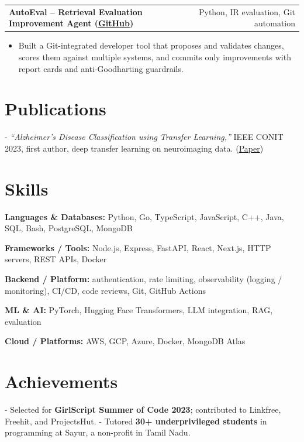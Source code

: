 \documentclass[letterpaper,11pt]{article}
\makeatletter
\newcommand{\projItem}[2]{%
  \vspace{6pt}
  \begin{tabular*}{\textwidth}{@{}l@{\extracolsep{\fill}}r@{}}
    \textbf{#1} & #2 \\
  \end{tabular*}\par\vspace{-2pt}
}
\newcommand{\skillLine}[2]{\textbf{#1:} #2\par\vspace{2pt}}
\newcommand{\inlineBlock}[1]{{\setlength{\leftskip}{0.18in}\small #1\par}}
\makeatother
\begin{document}
\projItem{AutoEval -- Retrieval Evaluation Improvement Agent {\normalfont\small(\href{https://github.com/Deva-1903/AutoEval}{GitHub})}}{Python, IR evaluation, Git automation}
\begin{itemize}
  \item Built a Git-integrated developer tool that proposes and validates changes, scores them against multiple systems, and commits only improvements with report cards and anti-Goodharting guardrails.
\end{itemize}

\section{Publications}
\inlineBlock{- \textit{``Alzheimer's Disease Classification using Transfer Learning,''} IEEE CONIT 2023, first author, deep transfer learning on neuroimaging data. {\normalfont\small(\href{https://ieeexplore.ieee.org/document/10205760}{Paper})}}

\section{Skills}
\skillLine{Languages \& Databases}{Python, Go, TypeScript, JavaScript, C++, Java, SQL, Bash, PostgreSQL, MongoDB}
\skillLine{Frameworks / Tools}{Node.js, Express, FastAPI, React, Next.js, HTTP servers, REST APIs, Docker}
\skillLine{Backend / Platform}{authentication, rate limiting, observability (logging / monitoring), CI/CD, code reviews, Git, GitHub Actions}
\skillLine{ML \& AI}{PyTorch, Hugging Face Transformers, LLM integration, RAG, evaluation}
\skillLine{Cloud / Platforms}{AWS, GCP, Azure, Docker, MongoDB Atlas}

\section{Achievements}
\inlineBlock{- Selected for \textbf{GirlScript Summer of Code 2023}; contributed to Linkfree, Freehit, and ProjectsHut. - Tutored \textbf{30+ underprivileged students} in programming at Sayur, a non-profit in Tamil Nadu.}
\end{document}
